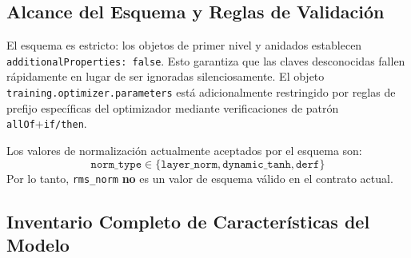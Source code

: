 \documentclass[11pt,a4paper]{article}
\begin{document}
\subsection{Alcance del Esquema y Reglas de Validación}
\label{sec:schema-validation}

El esquema es estricto: los objetos de primer nivel y anidados establecen \texttt{additionalProperties: false}. Esto garantiza que las claves desconocidas fallen rápidamente en lugar de ser ignoradas silenciosamente. El objeto \texttt{training.optimizer.parameters} está adicionalmente restringido por reglas de prefijo específicas del optimizador mediante verificaciones de patrón \texttt{allOf}+\texttt{if/then}.

Los valores de normalización actualmente aceptados por el esquema son:
\[
\texttt{norm\_type} \in \{\texttt{layer\_norm}, \texttt{dynamic\_tanh}, \texttt{derf}\}
\]
Por lo tanto, \texttt{rms\_norm} \textbf{no} es un valor de esquema válido en el contrato actual.

\subsection{Inventario Completo de Características del Modelo}
\end{document}
